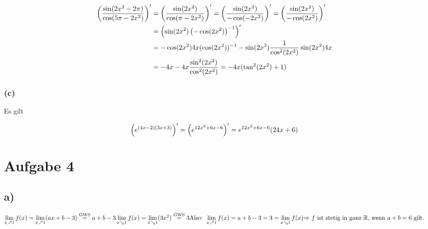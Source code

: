 \documentclass[a4paper, 11pt]{article}
\begin{document}
\begin{align*}
    \left(\frac{\sin(2x^2 - 2\pi)}{\cos(5\pi - 2x^2)}\right)' &=
        \left(\frac{\sin(2x^2)}{\cos(\pi - 2x^2)}\right)' =
        \left(\frac{\sin(2x^2)}{-\cos(-2x^2)}\right)' =
        \left(\frac{\sin(2x^2)}{-\cos(2x^2)}\right)' \\
    &= \left(\sin(2x^2)\left({-\cos(2x^2)}\right)^{-1}\right)' \\
    &= -\cos(2x^2) 4x (\cos(2x^2))^{-1} -
            \sin(2x^2) \frac{1}{\cos^2(2x^2)} \sin(2x^2) 4x \\
    &= -4x - 4x \frac{\sin^2(2x^2)}{\cos^2(2x^2)} = -4x(\tan^2(2x^2) + 1)
\end{align*}

\subsubsection{(c)}
\label{sec:org1eb343f}
Es gilt

$$ \left(e^{(4x - 2)(3x + 3)}\right)' = \left(e^{12x^2 + 6x - 6}\right)' =
    e^{12x^2 + 6x - 6}(24x + 6) $$

\section{Aufgabe 4}
\label{sec:org3ad8b5f}
\subsection{a)}
\label{sec:orgb69403c}
\begin{math}
    \lim \limits_{x \nearrow 1} f(x) =
        \lim \limits_{x \nearrow 1} (ax + b - 3)
        \overset{\text{GWS}}{=} a + b - 3
    \newline
    \newline
    \lim \limits_{x \searrow 1} f(x) =
        \lim \limits_{x \searrow 1} (3x^2) \overset{\text{GWS}}{=} 3
    \newline
    \newline
    \text{Also: }\lim \limits_{x \nearrow 1} f(x) =
        a + b - 3 = 3 = \lim \limits_{x \searrow 1} f(x)
    \newline
    \text{$\Rightarrow$ $f$ ist stetig in ganz } \R
        \text{, wenn } a + b = 6 \text{ gilt.}
\end{math}

\pagebreak
\end{document}
